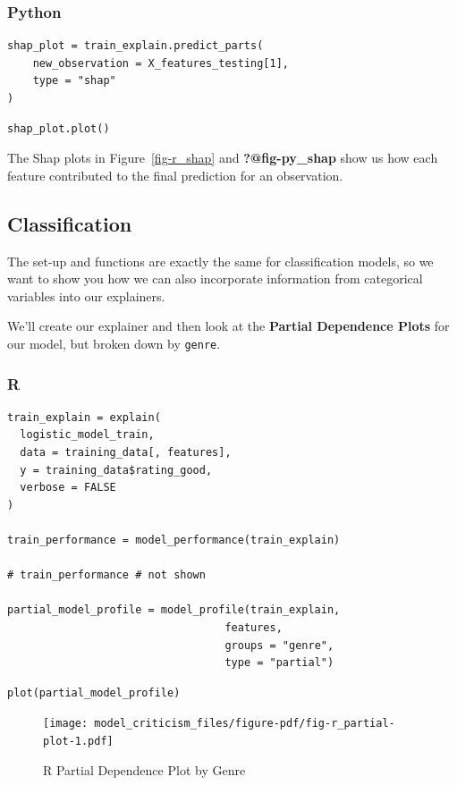 \documentclass[
  letterpaper,
]{krantz}
\begin{document}
\subsubsection{Python}

\begin{verbatim}
shap_plot = train_explain.predict_parts(
    new_observation = X_features_testing[1], 
    type = "shap"
)
\end{verbatim}

\begin{verbatim}
shap_plot.plot()
\end{verbatim}

The Shap plots in Figure~\ref{fig-r_shap} and \textbf{?@fig-py\_shap}
show us how each feature contributed to the final prediction for an
observation.

\subsection{Classification}\label{classification}

The set-up and functions are exactly the same for classification models,
so we want to show you how we can also incorporate information from
categorical variables into our explainers.

We'll create our explainer and then look at the \textbf{Partial
Dependence Plots} for our model, but broken down by \texttt{genre}.

\subsubsection{R}

\begin{verbatim}
train_explain = explain(
  logistic_model_train, 
  data = training_data[, features], 
  y = training_data$rating_good,
  verbose = FALSE
)

train_performance = model_performance(train_explain)

# train_performance # not shown

partial_model_profile = model_profile(train_explain, 
                                  features, 
                                  groups = "genre",
                                  type = "partial")
\end{verbatim}

\begin{verbatim}
plot(partial_model_profile)
\end{verbatim}

\begin{figure}[H]

{\centering \texttt{[image: model\_criticism\_files/figure-pdf/fig-r\_partial-plot-1.pdf]}

}

\caption{\label{fig-r_partial-plot}R Partial Dependence Plot by Genre}

\end{figure}
\end{document}
